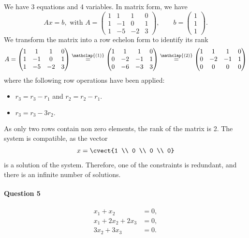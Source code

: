 We have 3 equations and 4 variables. In matrix form, we have
\[
Ax = b, \text{ with } A= \begin{pmatrix}
1&1&1&0\\ 1&-1&0&1\\ 1&-5&-2&3
\end{pmatrix}, \qquad b = \begin{pmatrix}
1\\1\\1
\end{pmatrix}.
\]
We transform the matrix into a row echelon form to identify its rank
\[
A=
\begin{pmatrix}
  1 & 1 & 1 & 0 \\ 1  & -1 & 0 & 1 \\ 1  & -5 & -2 & 3  
\end{pmatrix}
\stackrel{\mathclap{(1)}}{=}
\begin{pmatrix}
  1 & 1 & 1 & 0 \\ 0 & -2 & -1 & 1 \\ 0 & -6 & -3 & 3
\end{pmatrix}
\stackrel{\mathclap{(2)}}{=}
\begin{pmatrix}
  1 & 1 & 1 & 0 \\ 0 & -2 & -1 & 1 \\ 0 & 0 & 0 & 0 
\end{pmatrix}
\]
where the following row operations have been applied:
\begin{itemize}
\item[(1)] $r_3 = r_3 - r_1$ and $r_2=r_2-r_1$.
\item[(2)] $r_3 = r_3 -3 r_2$.
\end{itemize}
As only two rows contain non zero elements, the rank of the matrix is 2. 
The system is compatible, as the vector
\[
x=\cvect{1 \\ 0 \\ 0 \\ 0}
\]
is a solution of the system. Therefore, one of the constraints is
redundant, and there is an infinite number of solutions.

\paragraph*{Question 5}

\begin{align*}
x_1+x_2&=0,\\
x_1+2x_2+2x_3&=0,\\
3x_2+3x_3&=0.
\end{align*}

